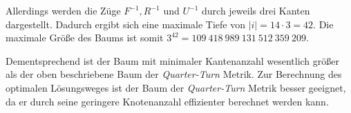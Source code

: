 \documentclass[12pt,a4paper, usenames, dvipsnames]{article}
\theoremstyle{mystyle}
\theoremstyle{definition}
\begin{document}
Allerdings werden die Züge $F^{-1}, R^{-1}$ und $U^{-1}$ durch jeweils drei Kanten dargestellt. Dadurch ergibt sich eine maximale Tiefe von $|i| = 14 \cdot 3 = 42$. Die maximale Größe des Baums ist somit $3^{42} = 109\ 418\ 989\ 131\ 512\ 359\ 209$. 

Dementsprechend ist der Baum mit minimaler Kantenanzahl wesentlich größer als der oben beschriebene Baum der \textit{Quarter-Turn} Metrik. Zur Berechnung des optimalen Lösungsweges ist der Baum der \textit{Quarter-Turn} Metrik besser geeignet, da er durch seine geringere Knotenanzahl effizienter berechnet werden kann.









\end{document}
